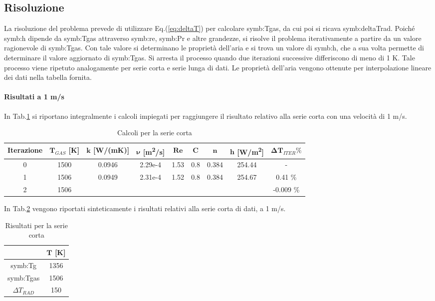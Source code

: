 \subsection{Risoluzione}
La risoluzione del problema prevede di utilizzare Eq.(\ref{eq:deltaT}) per calcolare \gls{symb:Tgas}, da cui poi si ricava \gls{symb:deltaTrad}. Poiché \gls{symb:h} dipende da \gls{symb:Tgas} attraverso \gls{symb:re}, \gls{symb:Pr} e altre grandezze, si risolve il problema iterativamente a partire da un valore ragionevole di \gls{symb:Tgas}. Con tale valore si determinano le proprietà dell'aria e si trova un valore di \gls{symb:h}, che a sua volta permette di determinare il valore aggiornato di \gls{symb:Tgas}. Si arresta il processo quando due iterazioni successive differiscono di meno di 1 K.
Tale processo viene ripetuto analogamente per serie corta e serie lunga di dati. 
Le proprietà dell'aria vengono ottenute per interpolazione lineare dei dati nella tabella fornita. 


\paragraph{Risultati a 1 m/s}
In Tab.\ref{tab:calcolishort1} si riportano integralmente i calcoli impiegati per raggiungere il risultato relativo alla serie corta con una velocità di 1 m/s. 

\begin{table}[H]
	\centering
	\begin{tabular}{c|c|c|c|c|c|c|c|c}
		\toprule
		\toprule
		\textbf{Iterazione} & $\bm{T_{\textit{GAS}}}$ [K]& $\bm{k}$ [W/(mK)] & $\bm{\nu}$ [m\textsuperscript{2}/s] & $\bm{Re}$ & $\bm{C}$ & $\bm{n}$ & $\bm{h}$ [W/m\textsuperscript{2}] & $\bm{\Delta T_{\textit{ITER}} \%}$\\
		\midrule
		\midrule
		0 & 1500 & 0.0946 & 2.29e-4 & 1.53 & 0.8 & 0.384 & 254.44 & - \\
		\midrule
		1 & 1506 & 0.0949 & 2.31e-4 & 1.52 & 0.8 & 0.384 & 254.67 & 0.41 \% \\
		\midrule
		2 & 1506 & & &  &  &  &  &  -0.009 \% \\
		\bottomrule
		\bottomrule	
	\end{tabular}
	\caption{Calcoli per la serie corta}
	\label{tab:calcolishort1}
\end{table}

In Tab.\ref{tab:risultatishort1} vengono riportati sinteticamente i risultati relativi alla serie corta di dati, a 1 m/s.

\begin{table}[H]
	\centering
	\begin{tabular}{c|c}
		\toprule
		\toprule
		& $\bm{T}$ [K]\\
		\midrule
		\midrule
		\gls{symb:Tg} & 1356 \\
		\midrule
		\gls{symb:Tgas} & 1506 \\
		\midrule
		$\Delta T_{\textit{RAD}}$ & 150 \\
		\bottomrule
		\bottomrule	
	\end{tabular}
	\caption{Risultati per la serie corta}
	\label{tab:risultatishort1}
\end{table}



